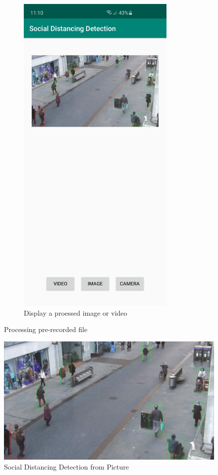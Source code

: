 \begin{figure}[h!]
\begin{subfigure}{.5\textwidth}
        \includegraphics[width=3in]{images/appendix-b/sh-output.jpg}
        \caption{Display a proessed image or video}
        \label{appendix-b:result}
        \end{subfigure}
        \caption{Processing pre-recorded file}
        \label{appendix-b:process}
    \end{figure}

    \begin{figure}[!ht]
        \includegraphics[width=6in]{images/chapter5/application/picture-detection.jpg}
        \caption{Social Distancing Detection from Picture}
        \label{appendix-b:sampleResult}
    \end{figure}


